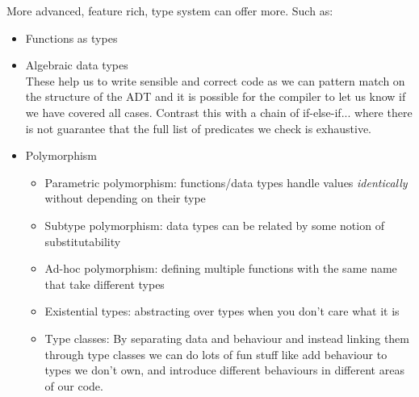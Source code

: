 	More advanced, feature rich, type system can offer more. Such as:
	\begin{itemize}
		\item Functions as types
		\item Algebraic data types \\
		These help us to write sensible and correct code as we can pattern match on the structure of the ADT and it is possible for the compiler to let us know if we have covered all cases. Contrast this with a chain of if-else-if... where there is not guarantee that the full list of predicates we check is exhaustive.
		\item Polymorphism
		\begin{itemize}
			\item Parametric polymorphism: functions/data types handle values \textit{identically} without depending on their type
			\item Subtype polymorphism: data types can be related by some notion of substitutability
			\item Ad-hoc polymorphism: defining multiple functions with the same name that take different types
			\item Existential types: abstracting over types when you don't care what it is
			\item Type classes: By separating data and behaviour and instead linking them through type classes we can do lots of fun stuff like add behaviour to types we don't own, and introduce different behaviours in different areas of our code.
		\end{itemize}
	\end{itemize}